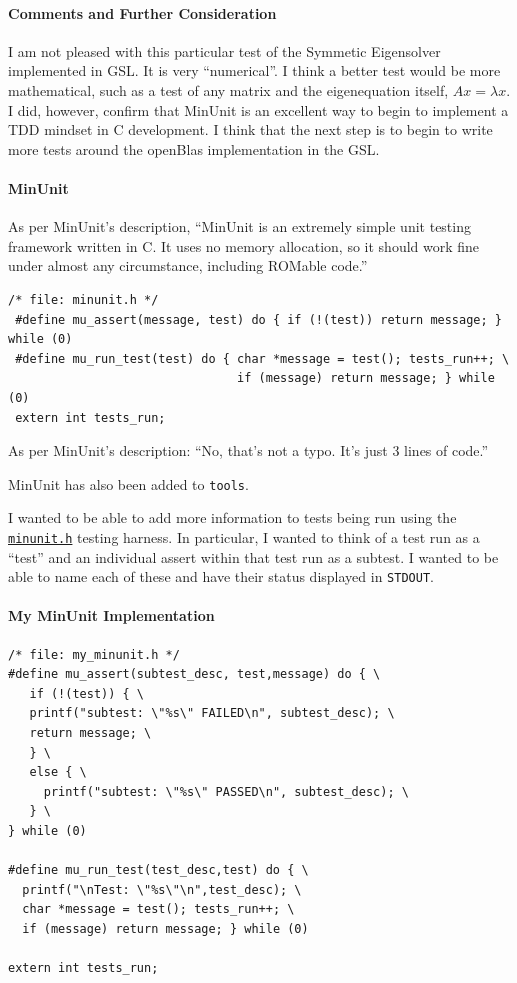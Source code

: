 \documentclass[12pt,]{book}
\let\oldparagraph\paragraph
\renewcommand{\paragraph}[1]{\oldparagraph{#1}\mbox{}}
\begin{document}
\paragraph{Comments and Further Consideration}

I am not pleased with this particular test of the Symmetic Eigensolver
implemented in GSL. It is very ``numerical''. I think a better test
would be more mathematical, such as a test of any matrix and the
eigenequation itself, \(Ax=\lambda x\). I did, however, confirm that
MinUnit is an excellent way to begin to implement a TDD mindset in C
development. I think that the next step is to begin to write more tests
around the openBlas implementation in the GSL.

\paragraph{MinUnit}

As per MinUnit's description, ``MinUnit is an extremely simple unit
testing framework written in C. It uses no memory allocation, so it
should work fine under almost any circumstance, including ROMable
code.''

\begin{verbatim}
/* file: minunit.h */
 #define mu_assert(message, test) do { if (!(test)) return message; } while (0)
 #define mu_run_test(test) do { char *message = test(); tests_run++; \
                                if (message) return message; } while (0)
 extern int tests_run;
\end{verbatim}

As per MinUnit's description: ``No, that's not a typo. It's just 3 lines
of code.''

MinUnit has also been added to \texttt{tools}.

I wanted to be able to add more information to tests being run using the
\href{http://www.jera.com/techinfo/jtns/jtn002.html}{\texttt{minunit.h}}
testing harness. In particular, I wanted to think of a test run as a
``test'' and an individual assert within that test run as a subtest. I
wanted to be able to name each of these and have their status displayed
in \texttt{STDOUT}.

\paragraph{My MinUnit Implementation}

\begin{verbatim}
/* file: my_minunit.h */
#define mu_assert(subtest_desc, test,message) do { \
   if (!(test)) { \
   printf("subtest: \"%s\" FAILED\n", subtest_desc); \
   return message; \
   } \
   else { \
     printf("subtest: \"%s\" PASSED\n", subtest_desc); \
   } \
} while (0)

#define mu_run_test(test_desc,test) do { \
  printf("\nTest: \"%s\"\n",test_desc); \
  char *message = test(); tests_run++; \
  if (message) return message; } while (0)

extern int tests_run;
\end{verbatim}
\end{document}

